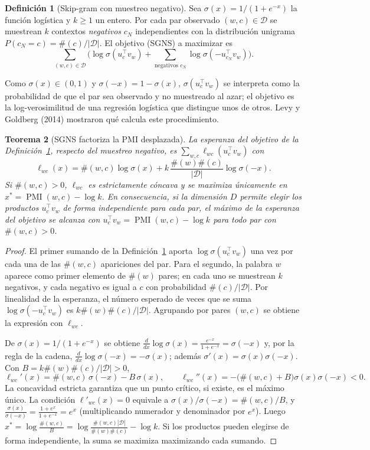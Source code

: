\documentclass[11pt]{article}
\newtheorem{teorema}{Teorema}[section]
\theoremstyle{definition}
\newtheorem{definicion}[teorema]{Definición}
\theoremstyle{remark}
\DeclareMathOperator{\PMI}{PMI}
\newcommand{\abs}[1]{\left\lvert #1\right\rvert}
\begin{document}
\begin{definicion}[Skip-gram con muestreo negativo]\label{def:sgns}
\noindent Sea $\sigma(x)=1/(1+e^{-x})$ la función logística y $k\ge1$ un entero. Por cada par observado $(w,c)\in\mathcal D$ se muestrean $k$ contextos \emph{negativos} $c_N$ independientes con la distribución unigrama $P(c_N=c)=\#(c)/\abs{\mathcal D}$. El objetivo (SGNS) a maximizar es
\[
\sum_{(w,c)\in\mathcal D}\Big(\log\sigma(u_c^\top v_w)+\sum_{\text{negativos }c_N}\log\sigma(-u_{c_N}^\top v_w)\Big).
\]
\end{definicion}

\noindent Como $\sigma(x)\in(0,1)$ y $\sigma(-x)=1-\sigma(x)$, $\sigma(u_c^\top v_w)$ se interpreta como la probabilidad de que el par sea observado y no muestreado al azar; el objetivo es la log-verosimilitud de una regresión logística que distingue unos de otros. Levy y Goldberg (2014) mostraron qué calcula este procedimiento.

\begin{teorema}[SGNS factoriza la PMI desplazada]\label{teo:sgns}
\noindent La esperanza del objetivo de la Definición~\ref{def:sgns}, respecto del muestreo negativo, es $\sum_{w,c}\ell_{wc}(u_c^\top v_w)$ con
\[
\ell_{wc}(x)=\#(w,c)\log\sigma(x)+k\,\frac{\#(w)\#(c)}{\abs{\mathcal D}}\log\sigma(-x).
\]
Si $\#(w,c)>0$, $\ell_{wc}$ es estrictamente cóncava y se maximiza únicamente en $x^*=\PMI(w,c)-\log k$. En consecuencia, si la dimensión $D$ permite elegir los productos $u_c^\top v_w$ de forma independiente para cada par, el máximo de la esperanza del objetivo se alcanza con $u_c^\top v_w=\PMI(w,c)-\log k$ para todo par con $\#(w,c)>0$.
\end{teorema}
\begin{proof}
\noindent El primer sumando de la Definición~\ref{def:sgns} aporta $\log\sigma(u_c^\top v_w)$ una vez por cada una de las $\#(w,c)$ apariciones del par. Para el segundo, la palabra $w$ aparece como primer elemento de $\#(w)$ pares; en cada uno se muestrean $k$ negativos, y cada negativo es igual a $c$ con probabilidad $\#(c)/\abs{\mathcal D}$. Por linealidad de la esperanza, el número esperado de veces que se suma $\log\sigma(-u_c^\top v_w)$ es $k\#(w)\#(c)/\abs{\mathcal D}$. Agrupando por pares $(w,c)$ se obtiene la expresión con $\ell_{wc}$.

\medskip

\noindent De $\sigma(x)=1/(1+e^{-x})$ se obtiene $\frac{d}{dx}\log\sigma(x)=\frac{e^{-x}}{1+e^{-x}}=\sigma(-x)$ y, por la regla de la cadena, $\frac d{dx}\log\sigma(-x)=-\sigma(x)$; además $\sigma'(x)=\sigma(x)\sigma(-x)$. Con $B=k\#(w)\#(c)/\abs{\mathcal D}>0$,
\[
\ell_{wc}'(x)=\#(w,c)\,\sigma(-x)-B\,\sigma(x),\qquad \ell_{wc}''(x)=-\big(\#(w,c)+B\big)\sigma(x)\sigma(-x)<0.
\]
La concavidad estricta garantiza que un punto crítico, si existe, es el máximo único. La condición $\ell'_{wc}(x)=0$ equivale a $\sigma(x)/\sigma(-x)=\#(w,c)/B$, y $\frac{\sigma(x)}{\sigma(-x)}=\frac{1+e^{x}}{1+e^{-x}}=e^x$ (multiplicando numerador y denominador por $e^x$). Luego $x^*=\log\frac{\#(w,c)}{B}=\log\frac{\#(w,c)\abs{\mathcal D}}{\#(w)\#(c)}-\log k$. Si los productos pueden elegirse de forma independiente, la suma se maximiza maximizando cada sumando.
\end{proof}
\end{document}
